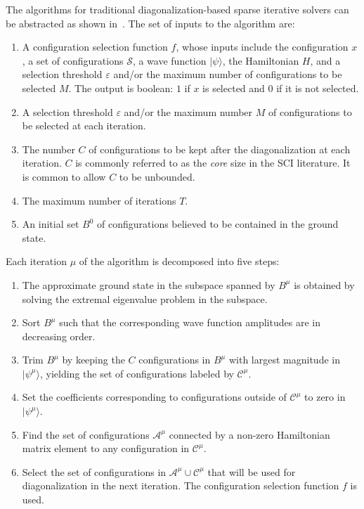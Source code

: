 \documentclass[
  reprint,            %
  amsmath,amssymb,
  aps,
  superscriptaddress, %
  longbibliography
]{revtex4-2}
\theoremstyle{definition}
\def\A{\mathcal{A}}
\def\C{\mathcal{C}}
\begin{document}
The algorithms for  traditional diagonalization-based sparse iterative solvers can be abstracted as shown in~. The set of inputs to the algorithm are:
\begin{enumerate}
    \item A configuration selection function $f$, whose inputs include the configuration $x$, a set of configurations $\mathcal{S}$, a wave function $|\psi\rangle$, the Hamiltonian $H$, and a selection threshold $\varepsilon$ and/or the maximum number of configurations to be selected $M$. The output is boolean: $1$ if $x$ is selected and $0$ if it is not selected.
    \item A selection threshold $\varepsilon$ and/or the maximum number $M$ of configurations to be selected at each iteration.
    \item The number $C$ of configurations to be kept after the diagonalization at each iteration. $C$ is commonly referred to as the \textit{core} size in the SCI literature. It is common to allow $C$ to be unbounded.
    \item The maximum number of iterations $T$.
    \item An initial set $B^0$ of configurations believed to be contained in the ground state.
\end{enumerate}
Each iteration $\mu$ of the algorithm is decomposed into five steps:
\begin{enumerate}
    \item The approximate ground state in the subspace spanned by $B^\mu$ is obtained by solving the extremal eigenvalue problem in the subspace.
    \item Sort $B^\mu$ such that the corresponding wave function amplitudes are in decreasing order.
    \item Trim $B^\mu$ by keeping the $C$ configurations in $B^\mu$ with largest magnitude in $|\psi^\mu\rangle$, yielding the set of configurations labeled by $\C^\mu$.
    \item Set the coefficients corresponding to configurations outside of $\C^\mu$ to zero in $|\psi^\mu\rangle$. 
    \item Find the set of configurations $\A^{\mu}$ connected by a non-zero Hamiltonian matrix element to any configuration in $\C^\mu$.
    \item Select the set of configurations in $\mathcal{A}^\mu \cup \mathcal{C}^\mu$ that will be used for diagonalization in the next iteration. The configuration selection function $f$ is used.
\end{enumerate}
\end{document}

